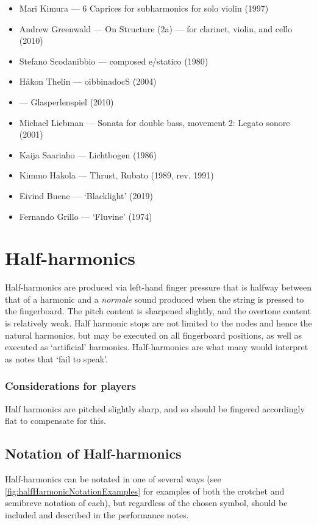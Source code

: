 \begin{itemize}
    \item Mari Kimura --- 6 Caprices for subharmonics for solo violin (1997) 
    \item Andrew Greenwald --- On Structure (2a) --- for clarinet, violin, and cello (2010)
    \item Stefano Scodanibbio --- composed e/statico (1980)
    \item Håkon Thelin --- oibbinadocS (2004)
    \item --- Glasperlenspiel (2010)
    \item Michael Liebman --- Sonata for double bass, movement 2: Legato sonore (2001)
    \item Kaija Saariaho --- Lichtbogen (1986)
    \item Kimmo Hakola --- Thrust, Rubato (1989, rev. 1991) 
    \item Eivind Buene --- `Blacklight' (2019)
    \item Fernando Grillo --- `Fluvine' (1974)
\end{itemize}

\section{Half-harmonics}\label{sec:half-harmonics}
Half-harmonics are produced via left-hand finger pressure that is halfway between that of a harmonic and a \emph{normale} sound produced when the string is pressed to the fingerboard.
The pitch content is sharpened slightly, and the overtone content is relatively weak.\autocite[113]{welbanksFoundationsModernCello}
Half harmonic stops are not limited to the nodes and hence the natural harmonics, but may be executed on all fingerboard positions, as well as executed as `artificial' harmonics.\autocite[127]{dimpkerExtendedNotationDepiction2012} 
Half-harmonics are what many would interpret as notes that `fail to speak'.

\subsubsection{Considerations for players}
Half harmonics are pitched slightly sharp, and so should be fingered accordingly flat to compensate for this.\autocite[113]{welbanksFoundationsModernCello}

\subsection{Notation of Half-harmonics}\label{sec:notation-half-harmonics}
Half-harmonics can be notated in one of several ways (see \autoref{fig:halfHarmonicNotationExamples} for examples of both the crotchet and semibreve notation of each), but regardless of the chosen symbol, should be included and described in the performance notes.


